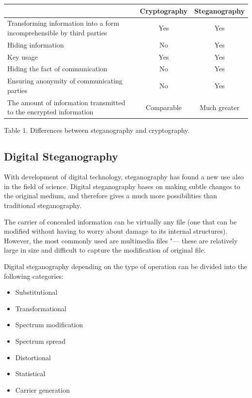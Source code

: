 \documentclass[10pt, a5paper]{article}
\begin{document}
\begin{table}[t!]
\begin{center}
\begin{tabular}{P{13em}|c|c}
\hline
                                                                            & Cryptography & Steganography \\
\hline
Transforming information into a form in\-compre\-hensible by third parties  &     Yes      &     Yes       \\
Hiding information                                                          &     No       &     Yes       \\
Key usage                                                                   &     Yes      &     Yes       \\
Hiding the fact of commu\-ni\-ca\-tion                                      &     No       &     Yes       \\
Ensuring anonymity of commu\-ni\-ca\-ting parties                           &     No       &     Yes       \\
The amount of information transmitted to the encrypted information          &  Comparable  &  Much greater \\
\hline
\end{tabular}

Table 1. Differences between steganography and cryptography.
\end{center}
\end{table}

\subsection*{Digital Steganography}

With development of digital technology, steganography has found a new use also in the field of science. Digital steganography bases on making subtle changes to the original medium, and therefore gives a much more possibilities than traditional steganography.

The carrier of concealed information can be virtually any file (one that can be modified without having to worry about damage to its internal structures). However, the most commonly used are multimedia files "--- these are relatively large in size and difficult to capture the modification of original file.

Digital steganography depending on the type of operation can be divided into the following categories:

\begin{itemize}
  \item Substitutional
  \item Transformational
  \item Spectrum modification
  \item Spectrum spread
  \item Distortional
  \item Statistical
  \item Carrier generation
\end{itemize}
\end{document}

